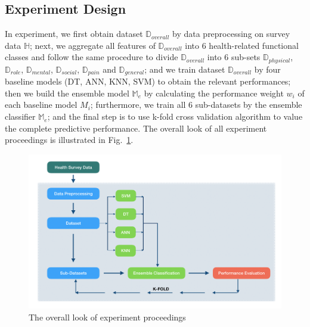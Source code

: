 \documentclass[10pt,journal,compsoc]{IEEEtran}
\begin{document}
\subsection{Experiment Design}
In experiment, we first obtain dataset $\mathbb{D}_{overall}$ by data preprocessing on survey data $\mathbb{H}$; next, we aggregate all features of $\mathbb{D}_{overall}$ into 6 health-related functional classes and follow the same procedure to divide $\mathbb{D}_{overall}$ into 6 sub-sets $\mathbb{D}_{physical}$, $\mathbb{D}_{role}$, $\mathbb{D}_{mental}$, $\mathbb{D}_{social}$, $\mathbb{D}_{pain}$ and $\mathbb{D}_{general}$; and we train dataset $\mathbb{D}_{overall}$ by four baseline models (DT, ANN, KNN, SVM) to obtain the relevant performances; then we build the ensemble model $\mathbb{M}_{e}$ by calculating the performance weight $w_{i}$ of each baseline model $M_{i} $; furthermore, we train all 6 sub-datasets by the ensemble classifier $\mathbb{M}_{e}$; and the final step is to use k-fold cross validation algorithm to value the complete predictive performance. The overall look of all experiment proceedings is illustrated in Fig.~\ref{fig4}. 
\begin{figure}[h]
\includegraphics[width=1\textwidth]{experiment.png}
\caption{The overall look of experiment proceedings} \label{fig4}
\end{figure}
\end{document}
